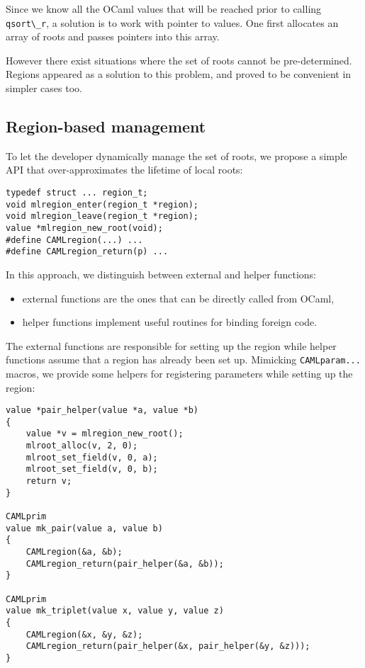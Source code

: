 \documentclass[a4paper]{easychair}
\newcommand{\cpp}[1]{\lstinline[style=C++]{#1}}
\begin{document}
Since we know all the OCaml values that will be reached prior to calling
\cpp{qsort\_r}, a solution is to work with pointer to values. One
first allocates an array of roots and passes pointers into this array.

However there exist situations where the set of roots cannot be pre-determined.
Regions appeared as a solution to this problem, and proved to be convenient in simpler cases too.

\subsection{Region-based management}

To let the developer dynamically manage the set of roots, we propose a
simple API that over-approximates the lifetime of local roots:
%
\begin{lstlisting}[style=C++]
typedef struct ... region_t;
void mlregion_enter(region_t *region);
void mlregion_leave(region_t *region);
value *mlregion_new_root(void);
#define CAMLregion(...) ...
#define CAMLregion_return(p) ...
\end{lstlisting}

In this approach, we distinguish between external and helper functions:
%
\begin{itemize}
\item external functions are the ones that can be directly called from OCaml,
\item helper functions implement useful routines for binding foreign code.
\end{itemize}

The external functions are responsible for setting up the region while
helper functions assume that a region has already been set up. Mimicking
\cpp{CAMLparam...} macros, we provide some helpers for registering
parameters while setting up the region:
%
\begin{lstlisting}[style=C++]
value *pair_helper(value *a, value *b)
{
    value *v = mlregion_new_root();
    mlroot_alloc(v, 2, 0);
    mlroot_set_field(v, 0, a);
    mlroot_set_field(v, 0, b);
    return v;
}

CAMLprim
value mk_pair(value a, value b)
{
    CAMLregion(&a, &b);
    CAMLregion_return(pair_helper(&a, &b));
}

CAMLprim
value mk_triplet(value x, value y, value z)
{
    CAMLregion(&x, &y, &z);
    CAMLregion_return(pair_helper(&x, pair_helper(&y, &z)));
}
\end{lstlisting}
\end{document}
